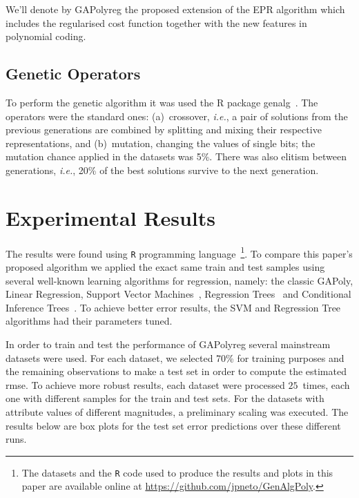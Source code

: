 \documentclass[preprint,authoryear,12pt]{elsarticle}
\begin{document}
We'll denote by \ac{GAPolyreg} the proposed extension of the EPR algorithm which includes the regularised cost function together with the new features in polynomial coding.

\subsection{Genetic Operators}

To perform the genetic algorithm it was used the R package genalg~\citep{Willighagen:2012aa}. The operators were the standard ones: (a)~crossover, \emph{i.e.}, a pair of solutions from the previous generations are combined by splitting and mixing their respective representations, and (b)~mutation, changing the values of single bits; the mutation chance applied in the datasets was 5\%. There was also elitism between generations, \emph{i.e.}, 20\% of the best solutions survive to the next generation.

\section{Experimental Results}

The results were found using \texttt{R} programming language~\citep{R-Core-Team:2013aa}\footnote{The datasets and the \texttt{R} code used to produce the results and plots in this paper are available online at \url{https://github.com/jpneto/GenAlgPoly}.}. To compare this paper's proposed algorithm we applied the exact same train and test samples using several well-known learning algorithms for regression, namely: the classic \ac{GAPoly}, Linear Regression, Support Vector Machines~\citep{Meyer:2012aa}, Regression Trees~\citep{Therneau:2013aa} and Conditional Inference Trees~\citep{Hothorn:2006aa,Strobl:2007aa,Strobl:2008aa}. To achieve better error results, the \ac{SVM} and Regression Tree algorithms had their parameters tuned.

In order to train and test the performance of \ac{GAPolyreg} several mainstream datasets were used. For each dataset, we selected 70\% for training purposes and the remaining observations to make a test set in order to compute the estimated \ac{rmse}. To achieve more robust results, each dataset were processed $25$~times, each one with different samples for the train and test sets. For the datasets with attribute values of different magnitudes, a preliminary scaling was executed. The results below are box plots for the test set error predictions over these different runs.
\end{document}
